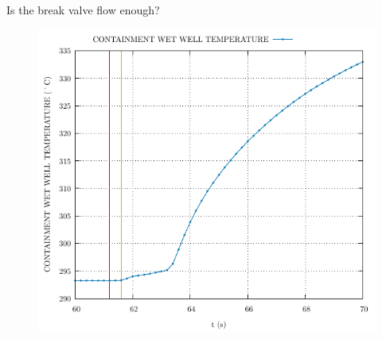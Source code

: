 \begin{frame}{Is the break valve flow enough?}
\begin{figure}
\begin{minipage}{.5\textwidth}
		\includegraphics[width=0.7\linewidth]{./graphs/CONTAINMENT WET WELL TEMPERATURE_start.pdf}
	\end{minipage}%
\end{figure}
\end{frame}




